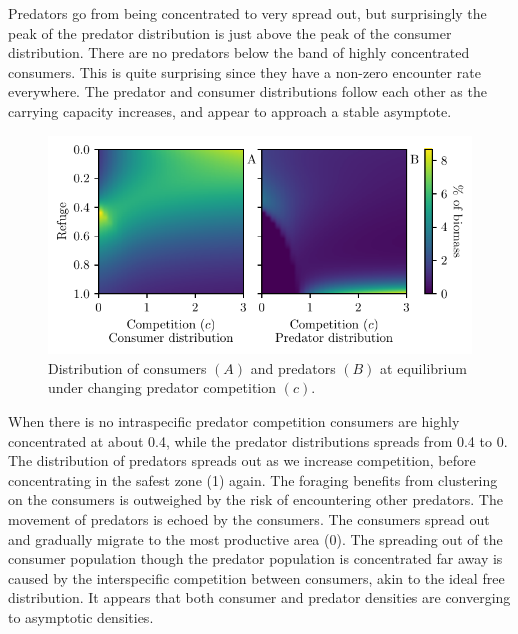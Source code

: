 Predators go from being concentrated to very spread out, but surprisingly the peak of the predator distribution is just above the peak of the consumer distribution. There are no predators below the band of highly concentrated consumers. This is quite surprising since they have a non-zero encounter rate everywhere. The predator and consumer distributions follow each other as the carrying capacity increases, and appear to approach a stable asymptote.





\begin{figure}[H]
  \caption{Distribution of consumers $(A)$ and predators $(B)$ at equilibrium under changing predator competition $(c)$.}
  \label{fig:strat_comp}
    \includegraphics{plots/increasing_competition_c.pdf}
\end{figure}

When there is no intraspecific predator competition consumers are highly concentrated at about 0.4, while the predator distributions spreads from 0.4 to 0. The distribution of predators spreads out as we increase competition, before concentrating in the safest zone (1) again. The foraging benefits from clustering on the consumers is outweighed by the risk of encountering other predators. The movement of predators is echoed by the consumers. The consumers spread out and gradually migrate to the most productive area (0). The spreading out of the consumer population though the predator population is concentrated far away is caused by the interspecific competition between consumers, akin to the ideal free distribution. It appears that both consumer and predator densities are converging to asymptotic densities. %

